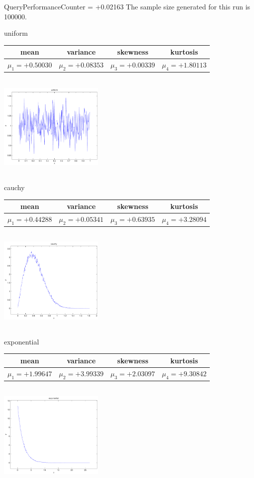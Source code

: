 \documentclass[9pt]{article}
\theoremstyle{plain}
\theoremstyle{definition}
\theoremstyle{remark}
\numberwithin{equation}{section}
\begin{document}
QueryPerformanceCounter  =  +0.02163
The sample size generated for this run is 100000.

\newpage
uniform \begin{tabular}{|c|c|c|c|}  mean & variance & skewness & kurtosis \\  \hline
$\mu_1 = +0.50030$ & $\mu_2 = +0.08353$ & $\mu_3 = +0.00339$ & $\mu_4 =+1.80113$ \\
\end{tabular}

\includegraphics[width=5cm,height=5cm]{uniform.pdf}

cauchy \begin{tabular}{|c|c|c|c|}  mean & variance & skewness & kurtosis \\  \hline
$\mu_1 = +0.44288$ & $\mu_2 = +0.05341$ & $\mu_3 = +0.63935$ & $\mu_4 =+3.28094$ \\
\end{tabular}

\includegraphics[width=5cm,height=5cm]{cauchy.pdf}

exponential \begin{tabular}{|c|c|c|c|}  mean & variance & skewness & kurtosis \\  \hline
$\mu_1 = +1.99647$ & $\mu_2 = +3.99339$ & $\mu_3 = +2.03097$ & $\mu_4 =+9.30842$ \\
\end{tabular}

\includegraphics[width=5cm,height=5cm]{exponential.pdf}
\end{document}
